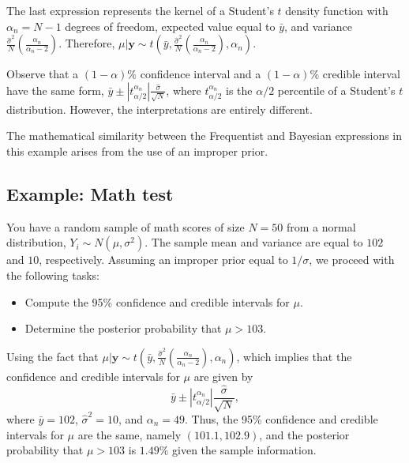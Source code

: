The last expression represents the kernel of a Student's $t$ density function with $\alpha_n = N - 1$ degrees of freedom, expected value equal to $\bar{y}$, and variance $\frac{\hat{\sigma}^2}{N} \left( \frac{\alpha_n}{\alpha_n - 2} \right)$. Therefore, $\mu | \mathbf{y} \sim t \left( \bar{y}, \frac{\hat{\sigma}^2}{N} \left( \frac{\alpha_n}{\alpha_n - 2} \right), \alpha_n \right)$.

Observe that a $(1-\alpha)\%$ confidence interval and a $(1-\alpha)\%$ credible interval have the same form, $\bar{y} \pm |t_{\alpha/2}^{\alpha_n}| \frac{\hat{\sigma}}{\sqrt{N}}$, where $t_{\alpha/2}^{\alpha_n}$ is the $\alpha/2$ percentile of a Student's $t$ distribution. However, the interpretations are entirely different.

The mathematical similarity between the Frequentist and Bayesian expressions in this example arises from the use of an improper prior.

\subsection{Example: Math test}\label{sec261}

You have a random sample of math scores of size $N = 50$ from a normal distribution, $Y_i \sim N(\mu, \sigma^2)$. The sample mean and variance are equal to $102$ and $10$, respectively. Assuming an improper prior equal to $1/\sigma$, we proceed with the following tasks:

\begin{itemize}
	\item Compute the 95\% confidence and credible intervals for $\mu$.
	\item Determine the posterior probability that $\mu > 103$.
\end{itemize}

Using the fact that $\mu | \mathbf{y} \sim t\left(\bar{y}, \frac{\hat{\sigma}^2}{N} \left( \frac{\alpha_n}{\alpha_n - 2} \right), \alpha_n \right)$, which implies that the confidence and credible intervals for $\mu$ are given by 
\[
\bar{y} \pm |t_{\alpha/2}^{\alpha_n}| \frac{\hat{\sigma}}{\sqrt{N}},
\]
where $\bar{y} = 102$, $\hat{\sigma}^2 = 10$, and $\alpha_n = 49$. Thus, the 95\% confidence and credible intervals for $\mu$ are the same, namely $(101.1, 102.9)$, and the posterior probability that $\mu > 103$ is $1.49\%$ given the sample information.

